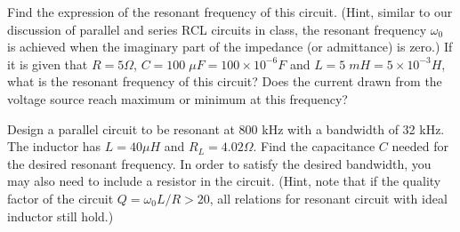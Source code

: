 
Find the expression of the resonant frequency of this circuit. (Hint,
similar to our discussion of parallel and series RCL circuits in class, 
the resonant frequency $\omega_0$ is achieved when the imaginary part of
the impedance (or admittance) is zero.) If it is given that $R=5\Omega$,
$C=100\;\mu F=100\times 10^{-6}F$ and $L=5\; mH=5\times 10^{-3}H$, what
is the resonant frequency of this circuit? Does the current drawn from 
the voltage source reach maximum or minimum at this frequency?

% 

%
%
% 


\item Design a parallel circuit to be resonant at 800 kHz with a bandwidth
of 32 kHz. The inductor has $L=40 \mu H$ and $R_L=4.02 \Omega$. Find the
capacitance $C$ needed for the desired resonant frequency. In order to
satisfy the desired bandwidth, you may also need to include a resistor 
in the circuit. (Hint, note that if the quality factor of the circuit
$Q=\omega_0 L/R > 20$, all relations for resonant circuit with ideal
inductor still hold.)


